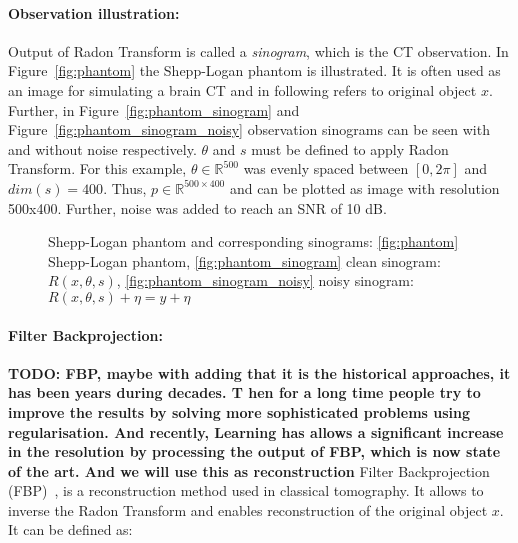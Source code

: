 \paragraph{Observation illustration:}

Output of Radon Transform is called a \textit{sinogram}, which is the CT observation.
In Figure~\ref{fig:phantom} the Shepp-Logan phantom is illustrated.
It is often used as an image for simulating a brain CT and in following refers to original object $x$. 
Further, in Figure~\ref{fig:phantom_sinogram} and Figure~\ref{fig:phantom_sinogram_noisy} 
observation sinograms can be seen with and without noise respectively. 
$\theta$ and $s$ must be defined to apply Radon Transform.
For this example, $\theta \in \mathbb{R}^{500}$ was evenly spaced
between $[0, 2 \pi]$ and $dim(s) = 400$. 
Thus, $p \in \mathbb{R}^{500 \times 400}$ and can be plotted as image with resolution 500x400. 
Further, noise was added to reach an SNR of 10 dB.

\begin{figure}[H]
    \label{fig:phantom_and_sinos}
    \hfill
    \hfill
    \hfill
    \hfill
	\caption{Shepp-Logan phantom and corresponding sinograms:
    \ref{fig:phantom} Shepp-Logan phantom,
    \ref{fig:phantom_sinogram} clean sinogram: $R(x, \theta, s)$,
    \ref{fig:phantom_sinogram_noisy} noisy sinogram: $R(x, \theta, s) + \eta = y + \eta$ 
    }
\end{figure}

\paragraph{Filter Backprojection:}
\textbf{TODO: FBP, maybe with adding that it is the historical approaches, it has been years during decades. T
hen for a long time people try to improve the results by solving more sophisticated problems using regularisation. 
And recently, Learning has allows a significant increase in the resolution by processing the output of FBP, which is now state of the art. 
And we will use this as reconstruction
}
Filter Backprojection (FBP)~\cite{tomographicReconstruction}, 
is a reconstruction method used in classical tomography.
It allows to inverse the Radon Transform and enables reconstruction of the original object $x$.
It can be defined as:

